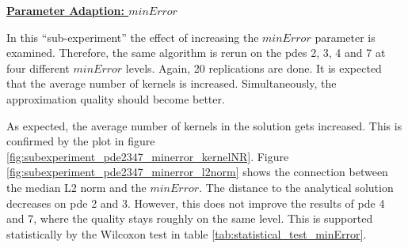 \documentclass[./\jobname.tex]{subfiles}
\begin{document}
\textbf{\underline{Parameter Adaption: $minError$}} 

In this ``sub-experiment'' the effect of increasing the $minError$ parameter is examined. Therefore, the same algorithm is rerun on the \gls{pde}s 2, 3, 4 and 7 at four different $minError$ levels. Again, 20 replications are done. It is expected that the average number of kernels is increased. Simultaneously, the approximation quality should become better. 

As expected, the average number of kernels in the solution gets increased. This is confirmed by the plot in figure \ref{fig:subexperiment_pde2347_minerror_kernelNR}. Figure \ref{fig:subexperiment_pde2347_minerror_l2norm} shows the connection between the median L2 norm and the $minError$. The distance to the analytical solution decreases on \gls{pde} 2 and 3. However, this does not improve the results of \gls{pde} 4 and 7, where the quality stays roughly on the same level. This is supported statistically by the Wilcoxon test in table \ref{tab:statistical_test_minError}.
\end{document}
